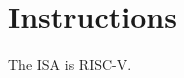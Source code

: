 \section{Instructions}
The ISA is RISC-V.


\clearpage

\clearpage

\clearpage

\clearpage

\clearpage

